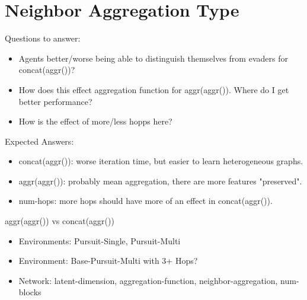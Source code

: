 \section{Neighbor Aggregation Type}
Questions to answer:
\begin{itemize}[noitemsep,nolistsep]
    \item Agents better/worse being able to distinguish themselves from evaders for concat(aggr())?
    \item How does this effect aggregation function for aggr(aggr()). Where do I get better performance?
    \item How is the effect of more/less hopps here?
\end{itemize}
Expected Answers:
\begin{itemize}[noitemsep,nolistsep]
    \item concat(aggr()): worse iteration time, but easier to learn heterogeneous graphs.
    \item aggr(aggr()): probably mean aggregation, there are more features "preserved".
    \item num-hops: more hops should have more of an effect in concat(aggr()).
\end{itemize}
aggr(aggr()) vs concat(aggr())
\begin{itemize}[noitemsep,nolistsep]
    \item Environments: Pursuit-Single, Pursuit-Multi
    \item Environment: Base-Pursuit-Multi with 3+ Hops?
    \item Network: latent-dimension, aggregation-function, neighbor-aggregation, num-blocks
\end{itemize}

